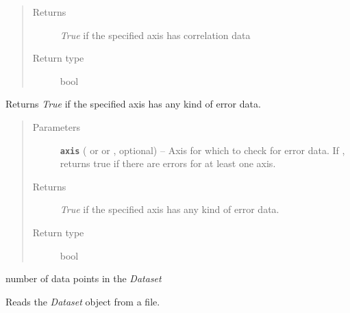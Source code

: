 \documentclass[a4paper,10pt,english]{sphinxmanual}
\begin{document}
\begin{fulllineitems}
\begin{fulllineitems}
\begin{quote}
\begin{description}
\item[{Returns}] \leavevmode
\emph{True} if the specified axis has correlation data

\item[{Return type}] \leavevmode
bool

\end{description}\end{quote}

\end{fulllineitems}


\begin{fulllineitems}
\label{index:kafe.dataset.Dataset.has_errors}
Returns \emph{True} if the specified axis has any kind of error data.
\begin{quote}\begin{description}
\item[{Parameters}] \leavevmode
\textbf{\texttt{axis}} ( or  or , optional) -- Axis for which to check for error data. If ,
returns true if there are errors for at least one axis.

\item[{Returns}] \leavevmode
\emph{True} if the specified axis has any kind of error data.

\item[{Return type}] \leavevmode
bool

\end{description}\end{quote}

\end{fulllineitems}


\begin{fulllineitems}
\label{index:kafe.dataset.Dataset.n_datapoints}
number of data points in the \emph{Dataset}

\end{fulllineitems}


\begin{fulllineitems}
\label{index:kafe.dataset.Dataset.read_from_file}
Reads the \emph{Dataset} object from a file.


\end{fulllineitems}
\end{fulllineitems}
\end{document}
